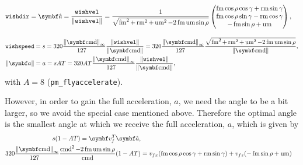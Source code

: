 \begin{align*}
\texttt{wishdir} &= \uvec{a} = \frac{\texttt{wishvel}}{\norm{\texttt{wishvel}}} = \frac{1}{\sqrt{\fmove^2 + \rmove^2 + \umove^2  - 2\fmove\umove\sin\rho}}
\begin{pmatrix}
\fmove \cos\rho\cos\gamma + \rmove \sin\gamma\\
\fmove \cos\rho\sin\gamma - \rmove \cos\gamma\\
-\fmove \sin\rho + \umove
\end{pmatrix},
\end{align*}

\begin{align*}
\texttt{wishspeed} &= s = 320\frac{\norm{\vec{\cmd}}_{\infty}}{127\hphantom{_{\infty}}} \frac{\norm{\texttt{wishvel}}}{\norm{\vec{\cmd}}} = 320\frac{\norm{\vec{\cmd}}_{\infty}}{127\hphantom{_{\infty}}} \frac{\sqrt{\fmove^2 + \rmove^2 + \umove^2  - 2\fmove\umove\sin\rho}}{\norm{\vec{\cmd}}},\\
\norm{\vec{a}} &= a = sAT = 320AT\frac{\norm{\vec{\cmd}}_{\infty}}{127\hphantom{_{\infty}}} \frac{\norm{\texttt{wishvel}}}{\norm{\vec{\cmd}}},
\end{align*}
with $A = 8$ (\texttt{pm\_flyaccelerate}).

However, in order to gain the full acceleration, $a$, we need the angle to be a bit larger, so we avoid the special case mentioned above. Therefore the optimal angle is the smallest angle at which we receive the full acceleration, $a$, which is given by
\begin{align*}
s(1-AT) = \vec{v}_f^T \uvec{a},\\
320\frac{\norm{\vec{\cmd}}_{\infty}}{127\hphantom{_{\infty}}} \frac{\cmd^2  - 2\fmove\umove\sin\rho}{\cmd}(1-AT) &= v_{fx}(\fmove \cos\rho\cos\gamma + \rmove \sin\gamma) + v_{fz}(-\fmove \sin\rho + \umove)
\end{align*}

